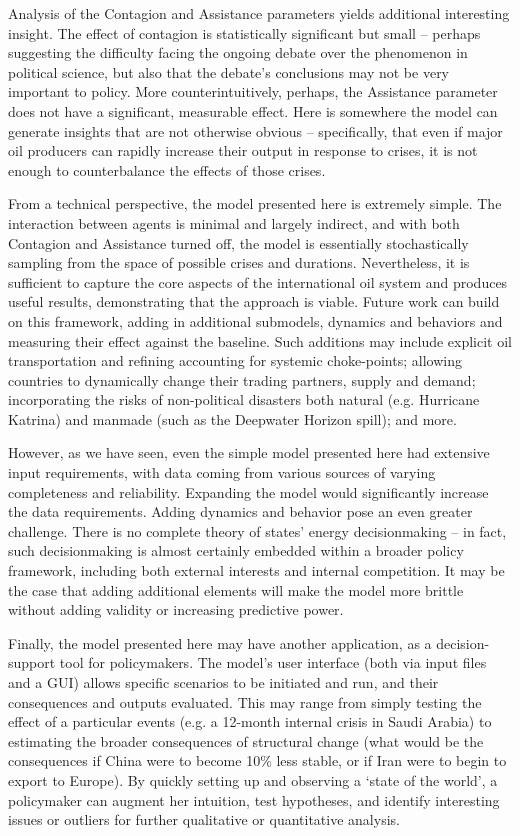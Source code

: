 \documentclass{article}
\begin{document}
Analysis of the Contagion and Assistance parameters yields additional interesting insight. The effect of contagion is statistically significant but small -- perhaps suggesting the difficulty facing the ongoing debate over the phenomenon in political science, but also that the debate's conclusions may not be very important to policy. More counterintuitively, perhaps, the Assistance parameter does not have a significant, measurable effect. Here is somewhere the model can generate insights that are not otherwise obvious -- specifically, that even if major oil producers can rapidly increase their output in response to crises, it is not enough to counterbalance the effects of those crises. 

From a technical perspective, the model presented here is extremely simple. The interaction between agents is minimal and largely indirect, and with both Contagion and Assistance turned off, the model is essentially stochastically sampling from the space of possible crises and durations. Nevertheless, it is sufficient to capture the core aspects of the international oil system and produces useful results, demonstrating that the approach is viable. Future work can build on this framework, adding in additional submodels, dynamics and behaviors and measuring their effect against the baseline. Such additions may include explicit oil transportation and refining accounting for systemic choke-points; allowing countries to dynamically change their trading partners, supply and demand; incorporating the risks of non-political disasters both natural (e.g. Hurricane Katrina) and manmade (such as the Deepwater Horizon spill); and more.

However, as we have seen, even the simple model presented here had extensive input requirements, with data coming from various sources of varying completeness and reliability. Expanding the model would significantly increase the data requirements. Adding dynamics and behavior pose an even greater challenge. There is no complete theory of states' energy decisionmaking -- in fact, such decisionmaking is almost certainly embedded within a broader policy framework, including both external interests and internal competition. It may be the case that adding additional elements will make the model more brittle without adding validity or increasing predictive power.

Finally, the model presented here may have another application, as a decision-support tool for policymakers. The model's user interface (both via input files and a GUI) allows specific scenarios to be initiated and run, and their consequences and outputs evaluated. This may range from simply testing the effect of a particular events (e.g. a 12-month internal crisis in Saudi Arabia) to estimating the broader consequences of structural change (what would be the consequences if China were to become 10\% less stable, or if Iran were to begin to export to Europe). By quickly setting up and observing a `state of the world', a policymaker can augment her intuition, test hypotheses, and identify interesting issues or outliers for further qualitative or quantitative analysis. 

\singlespacing


\end{document}
